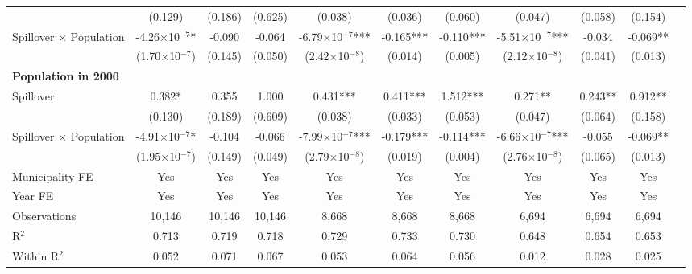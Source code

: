\documentclass{article}
\begin{document}
\begin{table}[htbp]
\begin{adjustbox}{width=\textwidth}
\begin{tabular}{lcccccccccc}
& (0.129) & (0.186) & (0.625) & (0.038) & (0.036) & (0.060) & (0.047) & (0.058) & (0.154) \\[0.5em]
Spillover × Population & -4.26$\times$10$^{-7}$* & -0.090 & -0.064 & -6.79$\times$10$^{-7}$*** & -0.165*** & -0.110*** & -5.51$\times$10$^{-7}$*** & -0.034 & -0.069** \\
& (1.70$\times$10$^{-7}$) & (0.145) & (0.050) & (2.42$\times$10$^{-8}$) & (0.014) & (0.005) & (2.12$\times$10$^{-8}$) & (0.041) & (0.013) \\[1em]
\multicolumn{10}{l}{\textbf{Population in 2000}} \\[0.5em]
Spillover & 0.382* & 0.355 & 1.000 & 0.431*** & 0.411*** & 1.512*** & 0.271** & 0.243** & 0.912** \\
& (0.130) & (0.189) & (0.609) & (0.038) & (0.033) & (0.053) & (0.047) & (0.064) & (0.158) \\[0.5em]
Spillover × Population & -4.91$\times$10$^{-7}$* & -0.104 & -0.066 & -7.99$\times$10$^{-7}$*** & -0.179*** & -0.114*** & -6.66$\times$10$^{-7}$*** & -0.055 & -0.069** \\
& (1.95$\times$10$^{-7}$) & (0.149) & (0.049) & (2.79$\times$10$^{-8}$) & (0.019) & (0.004) & (2.76$\times$10$^{-8}$) & (0.065) & (0.013) \\
\midrule
Municipality FE & Yes & Yes & Yes & Yes & Yes & Yes & Yes & Yes & Yes \\
Year FE & Yes & Yes & Yes & Yes & Yes & Yes & Yes & Yes & Yes \\
\midrule
Observations & 10,146 & 10,146 & 10,146 & 8,668 & 8,668 & 8,668 & 6,694 & 6,694 & 6,694 \\
R$^2$ & 0.713 & 0.719 & 0.718 & 0.729 & 0.733 & 0.730 & 0.648 & 0.654 & 0.653 \\
Within R$^2$ & 0.052 & 0.071 & 0.067 & 0.053 & 0.064 & 0.056 & 0.012 & 0.028 & 0.025 \\
\bottomrule
\end{tabular}
\end{adjustbox}
\end{table}
\end{document}
